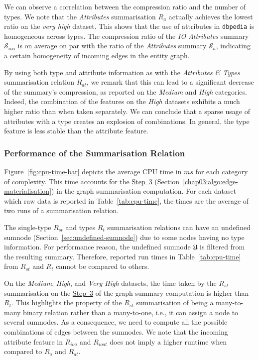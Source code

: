 We can observe a correlation between the compression ratio and the number of types.
We note that the \emph{Attributes} summarisation $R_a$ actually achieves the lowest ratio on the \emph{very high} dataset. This shows that the use of attributes in \texttt{dbpedia} is homogeneous across types. The compression ratio of the \emph{IO Attributes} summary $\mathcal{S}_{ioa}$ is on average on par with the ratio of the \emph{Attributes} summary $\mathcal{S}_a$, indicating a certain homogeneity of incoming edges in the entity graph.

By using both type and attribute information as with the \emph{Attributes \& Types} summarisation relation $R_{at}$, we remark that this can lead to a significant decrease of the summary's compression, as reported on the \emph{Medium} and \emph{High} categories.
Indeed, the combination of the features on the \emph{High} datasets exhibits a much higher ratio than when taken separately.%
We can conclude that a sparse usage of attributes with a type creates an explosion of combinations. In general, the type feature is less stable than the attribute feature.



\subsubsection{Performance of the Summarisation Relation}

Figure~\ref{fig:cpu-time-bar} depicts the average CPU time in $ms$ for each category of complexity. This time accounts for the \hyperref[step-he]{Step~3} (Section~\ref{chap03:algo:edge-materialisation}) in the graph summarisation computation.
For each dataset which raw data is reported in Table~\ref{tab:cpu-time}, the times are the average of two runs of a summarisation relation.

The single-type $R_{st}$ and types $R_t$ summarisation relations can have an undefined sumnode (Section~\ref{sec:undefined-sumnode}) due to some nodes having no type information. For performance reason, the undefined sumnode $\mathfrak{U}$ is filtered from the resulting summary. Therefore, reported run times in Table~\ref{tab:cpu-time} from $R_{st}$ and $R_t$ cannot be compared to others.

On the \emph{Medium}, \emph{High}, and \emph{Very High} datasets, the time taken by the $R_{st}$ summarisation on the \hyperref[step-he]{Step~3} of the graph summary computation is higher than $R_t$. This highlights the property of the $R_{st}$ summarisation of being a many-to-many binary relation rather than a many-to-one, i.e., it can assign a node to several sumnodes. As a consequence, we need to compute all the possible combinations of edges between the sumnodes.
We note that the incoming attribute feature in $R_{ioa}$ and $R_{ioat}$ does not imply a higher runtime when compared to $R_{a}$ and $R_{at}$.

